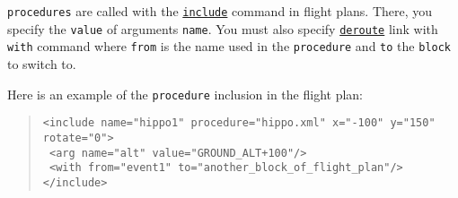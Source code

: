 \documentclass{article}
\renewcommand{\tt}[1]{\texttt{#1}}
\newcommand{\ex}[1]{\colorbox[gray]{0.92}{\tt{#1}}}
\newcommand{\hs}[1]{\hspace*{#1cm}}
\newcommand{\qt}[1]{\textcolor{gris75}{#1}}
\begin{document}
\tt{procedures} are called with the \hyperlink{include}{\tt{include}} command
in flight plans. There, you specify the \tt{value} of arguments \tt{name}.
You must also specify \hyperlink{deroute}{\tt{deroute}} link with \tt{with}
command where \tt{from} is the name used in the \tt{procedure} and \tt{to}
the \tt{block} to switch to.

\begin{minipage}[ctb]{\textwidth}
Here is an example of the \tt{procedure} inclusion in the flight plan:
\begin{quote}
	\ex{<include name="\qt{hippo1}" procedure="\qt{hippo.xml}" x="\qt{-100}" y="\qt{150}" rotate="\qt{0}">} \\
	\ex{\hs{0.5} <arg name="\qt{alt}" value="\qt{GROUND\_ALT+100}"/>} \\
	\ex{\hs{0.5} <with from="\qt{event1}" to="\qt{another\_block\_of\_flight\_plan}"/>} \\
	\ex{</include>} \\
\end{quote}
\end{minipage}
\end{document}
